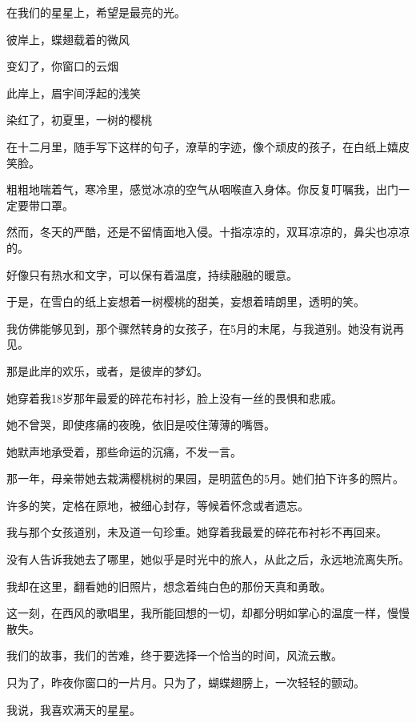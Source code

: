 \documentclass[12pt,a4paper]{article}
\def\blankrev{\vspace{1ex}}									%
\begin{document}
	\endwriting



		\longpoem{}{}{}
		在我们的星星上，希望是最亮的光。

		彼岸上，蝶翅载着的微风

		变幻了，你窗口的云烟

		此岸上，眉宇间浮起的浅笑

		染红了，初夏里，一树的樱桃
		\endlongpoem


		在十二月里，随手写下这样的句子，潦草的字迹，像个顽皮的孩子，在白纸上嬉皮笑脸。

		粗粗地喘着气，寒冷里，感觉冰凉的空气从咽喉直入身体。你反复叮嘱我，出门一定要带口罩。

		然而，冬天的严酷，还是不留情面地入侵。十指凉凉的，双耳凉凉的，鼻尖也凉凉的。

		\blankrev
		好像只有热水和文字，可以保有着温度，持续融融的暖意。


		\blankrev
		于是，在雪白的纸上妄想着一树樱桃的甜美，妄想着晴朗里，透明的笑。

		我仿佛能够见到，那个骤然转身的女孩子，在5月的末尾，与我道别。她没有说再见。

		那是此岸的欢乐，或者，是彼岸的梦幻。


		\blankrev
		她穿着我18岁那年最爱的碎花布衬衫，脸上没有一丝的畏惧和悲戚。

		她不曾哭，即使疼痛的夜晚，依旧是咬住薄薄的嘴唇。

		她默声地承受着，那些命运的沉痛，不发一言。


		\blankrev
		那一年，母亲带她去栽满樱桃树的果园，是明蓝色的5月。她们拍下许多的照片。

		许多的笑，定格在原地，被细心封存，等候着怀念或者遗忘。

		我与那个女孩道别，未及道一句珍重。她穿着我最爱的碎花布衬衫不再回来。

		没有人告诉我她去了哪里，她似乎是时光中的旅人，从此之后，永远地流离失所。

		我却在这里，翻看她的旧照片，想念着纯白色的那份天真和勇敢。


		\blankrev
		这一刻，在西风的歌唱里，我所能回想的一切，却都分明如掌心的温度一样，慢慢散失。

		我们的故事，我们的苦难，终于要选择一个恰当的时间，风流云散。

		只为了，昨夜你窗口的一片月。只为了，蝴蝶翅膀上，一次轻轻的颤动。


		\blankrev
		我说，我喜欢满天的星星。
\end{document}
